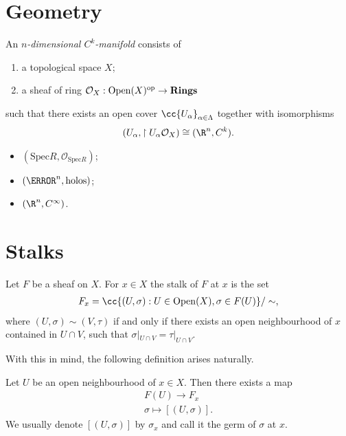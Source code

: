 \documentclass{article}
\begin{document}
\section{Geometry}

\begin{definition}
  An \emph{$n$-dimensional $C^k$-manifold} consists of
  \begin{enumerate}
    \item a topological space $X$;
    \item a sheaf of ring $\mathcal O_X:\operatorname{Open}(X)^{\text{op}}\to\textbf{Rings}$
  \end{enumerate}
  such that there exists an open cover $\cc{U_\alpha}_{\alpha\in\Lambda}$
  together with isomorphisms
  \begin{align*}
    (U_\alpha,\restriction{U_\alpha}{\mathcal O_X})\cong (\R^n,C^k).
  \end{align*}
\end{definition}

\begin{example}
  \begin{itemize}
    \item $(\text{Spec} R,\mathcal O_{\text{Spec} R})$;
    \item $(\C^n, \text{holos})$;
    \item $(\R^n, C^\infty)$.
  \end{itemize}
\end{example}

\section{Stalks}

\begin{definition}
  Let $F$ be a sheaf on $X$. For $x \in X$ the stalk of $F$ at $x$ is the set
  \begin{align*}
    F_x = \cc{(U, \sigma) : U \in \Open(X), \sigma \in F(U)} / \sim,
  \end{align*}
  where $(U, \sigma) \sim (V, \tau)$ if and only if there exists an open neighbourhood
  of $x$ contained in $U \cap V$, such that $\sigma|_{U\cap V} = \tau|_{U\cap V}$.
\end{definition}

With this in mind, the following definition arises naturally.
\begin{definition}
  Let $U$ be an open neighbourhood of $x \in X$. Then there exists a map
  \begin{align*}
    F(U) \to F_x\\
    \sigma \mapsto [(U, \sigma)].
  \end{align*}
  We usually denote $[(U, \sigma)]$ by $\sigma_x$ and call it the germ of $\sigma$ at $x$. 
\end{definition}
\end{document}
